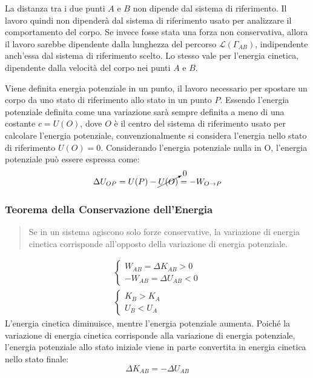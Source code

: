 \documentclass{article}
\numberwithin{equation}{subsection}
\begin{document}
La  distanza tra i due punti $A$ e $B$ non dipende dal sistema di 
riferimento. 
Il lavoro quindi non dipenderà dal sistema di riferimento usato per 
analizzare il comportamento del corpo. 
Se invece fosse stata una forza non conservativa, allora il 
lavoro sarebbe dipendente dalla lunghezza del percorso $\mathscr{L} (\Gamma_{AB})$, 
indipendente anch'essa dal sistema di riferimento scelto. 
Lo stesso vale per l'energia cinetica, dipendente dalla velocità 
del corpo nei punti $A$ e $B$.


Viene definita energia potenziale in un punto, il lavoro necessario per spostare un corpo da uno stato di riferimento allo stato in un punto $P$. Essendo l'energia potenziale 
definita come una variazione sarà sempre definita a meno di una costante $c=U(O)$, dove $O$ è il centro del sistema di riferimento usato per calcolare l'energia potenziale, 
convenzionalmente si considera l'energia nello stato di riferimento $U(O)=0$. Considerando l'energia potenziale nulla in O, l'energia potenziale può essere espressa come: 
\begin{equation}
    \Delta U_{OP}=U(P)-\cancelto{0}{U(O)}=-W_{O\to P}
\end{equation} 

\subsubsection{Teorema della Conservazione dell'Energia}
\begin{quotation}
    Se in un sistema agiscono solo forze conservative, la variazione di energia cinetica corrisponde all'opposto della variazione di energia potenziale. 
\end{quotation}
\begin{gather*}
    \begin{cases}
       W_{AB}=\Delta K_{AB}>0\\
      -W_{AB}=\Delta U_{AB}<0
    \end{cases}\\
    \begin{cases}
        K_B>K_A\\
        U_B<U_A
    \end{cases}
\end{gather*}
L'energia cinetica diminuisce, mentre l'energia potenziale aumenta. Poiché la variazione di energia cinetica corrisponde alla variazione di energia potenziale, l'energia 
potenziale allo stato iniziale viene in parte convertita in energia cinetica nello stato finale: 
\begin{equation}
    \Delta K_{AB}=-\Delta U_{AB}
\end{equation}
\end{document}
